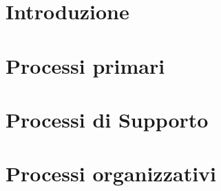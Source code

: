 \documentclass{article}
\begin{document}


\section{Introduzione}%
\label{sec:introduzione}


\newpage

\section{Processi primari}%
\label{sec:processi-primari}


\newpage

\section{Processi di Supporto}%
\label{sec:processi-di-supporto}


\newpage

\section{Processi organizzativi}%
\label{sec:processi-organizzativi}

\end{document}
